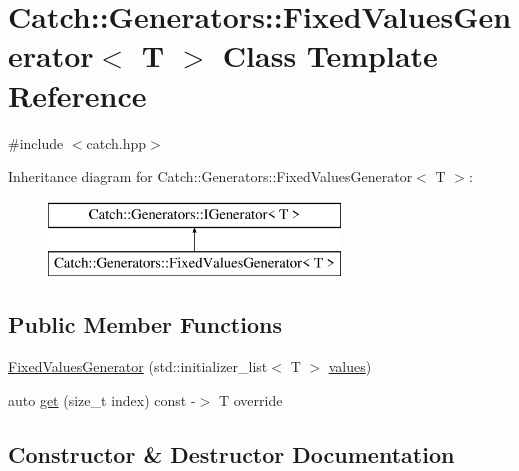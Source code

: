 \hypertarget{class_catch_1_1_generators_1_1_fixed_values_generator}{}\section{Catch\+:\+:Generators\+:\+:Fixed\+Values\+Generator$<$ T $>$ Class Template Reference}
\label{class_catch_1_1_generators_1_1_fixed_values_generator}


{\ttfamily \#include $<$catch.\+hpp$>$}

Inheritance diagram for Catch\+:\+:Generators\+:\+:Fixed\+Values\+Generator$<$ T $>$\+:\begin{figure}[H]
\begin{center}
\leavevmode
\includegraphics[height=2.000000cm]{class_catch_1_1_generators_1_1_fixed_values_generator}
\end{center}
\end{figure}
\subsection*{Public Member Functions}
\begin{DoxyCompactItemize}
\item 
\mbox{\hyperlink{class_catch_1_1_generators_1_1_fixed_values_generator_a6e9f473655413c1cb15f079890f06b86}{Fixed\+Values\+Generator}} (std\+::initializer\+\_\+list$<$ T $>$ \mbox{\hyperlink{namespace_catch_1_1_generators_abd89db7c0024d0ea5715a3cd6336214c}{values}})
\item 
auto \mbox{\hyperlink{class_catch_1_1_generators_1_1_fixed_values_generator_a3ed654a5860c170dbe7b01487b83253d}{get}} (size\+\_\+t index) const -\/$>$ T override
\end{DoxyCompactItemize}


\subsection{Constructor \& Destructor Documentation}
\mbox{\label{class_catch_1_1_generators_1_1_fixed_values_generator_a6e9f473655413c1cb15f079890f06b86}} 
